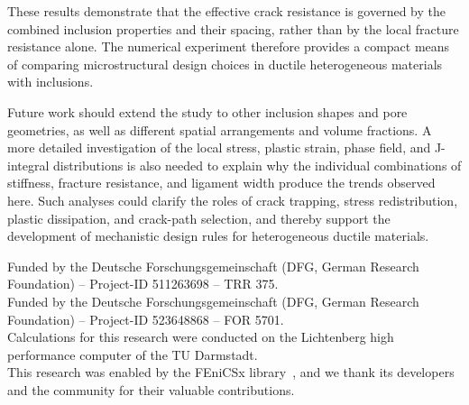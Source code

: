 \documentclass[pamm,a4paper,fleqn]{w-art}
\begin{document}
These results demonstrate that the effective crack resistance is
governed by the combined inclusion properties and their spacing,
rather than by the local fracture resistance alone. The numerical
experiment therefore provides a compact means of comparing
microstructural design choices in ductile heterogeneous materials
with inclusions.

Future work should extend the study to other inclusion shapes and
pore geometries, as well as different spatial arrangements and volume
fractions. A more detailed investigation of the local stress, plastic
strain, phase field, and J-integral distributions is also needed to
explain why the individual combinations of stiffness, fracture
resistance, and ligament width produce the trends observed here. Such
analyses could clarify the roles of crack trapping, stress
redistribution, plastic dissipation, and crack-path selection, and
thereby support the development of mechanistic design rules for
heterogeneous ductile materials.

\begin{acknowledgement}

Funded by the Deutsche Forschungsgemeinschaft (DFG, German Research
Foundation) -- Project-ID 511263698 -- TRR 375.\\
Funded by the Deutsche Forschungsgemeinschaft (DFG, German Research
Foundation) -- Project-ID 523648868 -- FOR 5701.\\
Calculations for this research were conducted on the Lichtenberg high
performance computer of the TU Darmstadt.\\
This research was enabled by the FEniCSx library~\cite{_fenicsx_},
and we thank its developers and the community for their valuable
contributions.
\end{acknowledgement}



\end{document}
